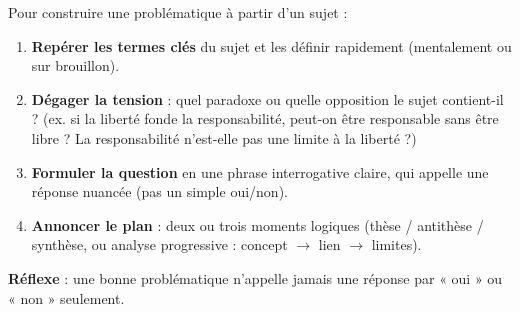 \documentclass[11pt]{article}
\begin{document}
\begin{methode}
Pour construire une problématique à partir d'un sujet :
\begin{enumerate}
\item \textbf{Repérer les termes clés} du sujet et les définir rapidement (mentalement ou sur brouillon).
\item \textbf{Dégager la tension} : quel paradoxe ou quelle opposition le sujet contient-il ? (ex. si la liberté fonde la responsabilité, peut-on être responsable sans être libre ? La responsabilité n'est-elle pas une limite à la liberté ?)
\item \textbf{Formuler la question} en une phrase interrogative claire, qui appelle une réponse nuancée (pas un simple oui/non).
\item \textbf{Annoncer le plan} : deux ou trois moments logiques (thèse / antithèse / synthèse, ou analyse progressive : concept $\rightarrow$ lien $\rightarrow$ limites).
\end{enumerate}
\textbf{Réflexe} : une bonne problématique n'appelle jamais une réponse par « oui » ou « non » seulement.
\end{methode}
\end{document}
